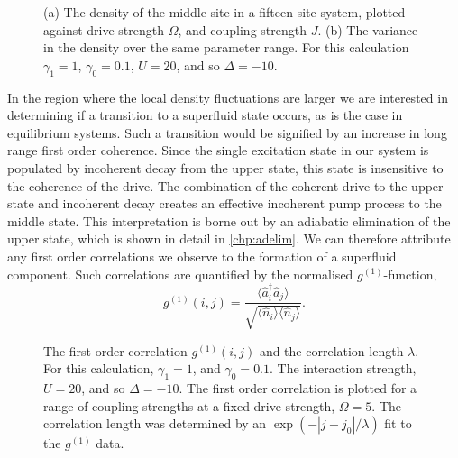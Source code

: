 \begin{figure}[ht]
	 \hfill
	\caption{\label{fig:dnlca4-1} (a) The density of the middle site in a fifteen site system, plotted against drive strength \(\Omega\), and coupling strength \(J\). (b) The variance in the density over the same parameter range. For this calculation \(\gamma_{1} = 1\), \(\gamma_{0} = 0.1\), \(U = 20\), and so \(\Delta = -10\).}
\end{figure}

In the region where the local density fluctuations are larger we are interested in determining if a transition to a superfluid state occurs, as is the case in equilibrium systems. Such a transition would be signified by an increase in long range first order coherence. Since the single excitation state in our system is populated by incoherent decay from the upper state, this state is insensitive to the coherence of the drive. The combination of the coherent drive to the upper state and incoherent decay creates an effective incoherent pump process to the middle state. This interpretation is borne out by an adiabatic elimination of the upper state, which is shown in detail in \cref{chp:adelim}. We can therefore attribute any first order correlations we observe to the formation of a superfluid component. Such correlations are quantified by the normalised \(g^{(1)}\)-function,
\begin{equation}
	g^{(1)}(i,j) = \frac{\langle \hat{a}_{i}^{\dagger} \hat{a}_{j} \rangle}{\sqrt{\langle \hat{n}_{i} \rangle \langle \hat{n}_{j} \rangle}}.
	\label{eq:dnlca4-1}
\end{equation}

\begin{figure}[ht]
	 \hfill
	\caption{\label{fig:dnlca4-2} The first order correlation \(g^{(1)}(i,j)\) and the correlation length $\lambda$. For this calculation, \(\gamma_{1} = 1\), and \(\gamma_{0} = 0.1\). The interaction strength, \(U = 20\), and so \(\Delta = -10\). The first order correlation is plotted for a range of coupling strengths at a fixed drive strength, \(\Omega = 5\). The correlation length was determined by an \(\exp(- |j-j_{0}|/\lambda)\) fit to the \(g^{(1)}\) data.}
\end{figure}

